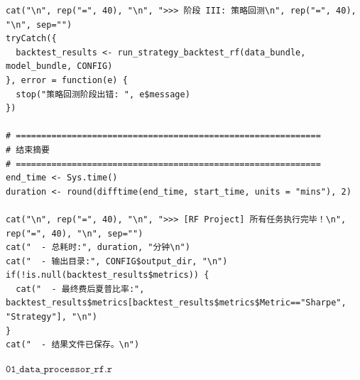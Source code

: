\documentclass[11pt, a4paper]{article}
\begin{document}
\begin{verbatim}
cat("\n", rep("=", 40), "\n", ">>> 阶段 III: 策略回测\n", rep("=", 40), "\n", sep="")
tryCatch({
  backtest_results <- run_strategy_backtest_rf(data_bundle, model_bundle, CONFIG)
}, error = function(e) {
  stop("策略回测阶段出错: ", e$message)
})

# ============================================================
# 结束摘要
# ============================================================
end_time <- Sys.time()
duration <- round(difftime(end_time, start_time, units = "mins"), 2)

cat("\n", rep("=", 40), "\n", ">>> [RF Project] 所有任务执行完毕！\n", rep("=", 40), "\n", sep="")
cat("  - 总耗时:", duration, "分钟\n")
cat("  - 输出目录:", CONFIG$output_dir, "\n")
if(!is.null(backtest_results$metrics)) {
  cat("  - 最终费后夏普比率:", backtest_results$metrics[backtest_results$metrics$Metric=="Sharpe", "Strategy"], "\n")
}
cat("  - 结果文件已保存。\n")
\end{verbatim}
$\texttt{01\_data\_processor\_rf.r}$
\end{document}
